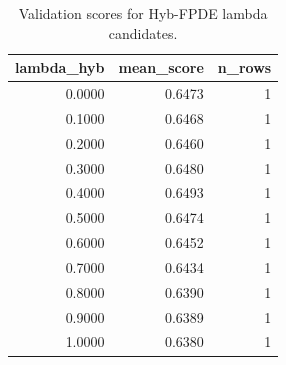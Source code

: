 \begin{table}[t]
\caption{Validation scores for Hyb-FPDE lambda candidates.}
\label{tab:lambda_distribution_computed}
\centering
\begin{tabular}{rrr}
\toprule
lambda\_hyb & mean\_score & n\_rows \\
\midrule
0.0000 & 0.6473 & 1 \\
0.1000 & 0.6468 & 1 \\
0.2000 & 0.6460 & 1 \\
0.3000 & 0.6480 & 1 \\
0.4000 & 0.6493 & 1 \\
0.5000 & 0.6474 & 1 \\
0.6000 & 0.6452 & 1 \\
0.7000 & 0.6434 & 1 \\
0.8000 & 0.6390 & 1 \\
0.9000 & 0.6389 & 1 \\
1.0000 & 0.6380 & 1 \\
\bottomrule
\end{tabular}

\end{table}
